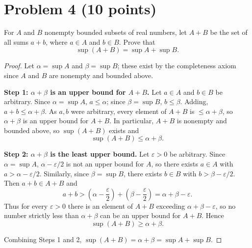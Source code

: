 \documentclass[11pt]{article}
\begin{document}
\section*{Problem 4 (10 points)}
For $A$ and $B$ nonempty bounded subsets of real numbers, let $A+B$ be
the set of all sums $a+b$, where $a\in A$ and $b\in B$. Prove that
\[
  \sup(A+B) = \sup A + \sup B.
\]

\begin{proof}
Let $\alpha = \sup A$ and $\beta = \sup B$; these exist by the completeness axiom since $A$ and $B$ are nonempty and bounded above.

\textbf{Step 1: $\alpha+\beta$ is an upper bound for $A+B$.} Let $a\in A$ and $b\in B$ be arbitrary. Since $\alpha=\sup A$, $a\le\alpha$; since $\beta=\sup B$, $b\le\beta$. Adding, $a+b \le \alpha+\beta$. As $a,b$ were arbitrary, every element of $A+B$ is $\le \alpha+\beta$, so $\alpha+\beta$ is an upper bound for $A+B$. In particular, $A+B$ is nonempty and bounded above, so $\sup(A+B)$ exists and
\[
\sup(A+B) \le \alpha+\beta.
\]

\textbf{Step 2: $\alpha+\beta$ is the least upper bound.} Let $\varepsilon>0$ be arbitrary. Since $\alpha=\sup A$, $\alpha-\varepsilon/2$ is not an upper bound for $A$, so there exists $a\in A$ with $a > \alpha-\varepsilon/2$. Similarly, since $\beta=\sup B$, there exists $b\in B$ with $b>\beta-\varepsilon/2$. Then $a+b\in A+B$ and
\[
a+b > \left(\alpha-\frac{\varepsilon}{2}\right)+\left(\beta-\frac{\varepsilon}{2}\right) = \alpha+\beta-\varepsilon.
\]
Thus for every $\varepsilon>0$ there is an element of $A+B$ exceeding $\alpha+\beta-\varepsilon$, so no number strictly less than $\alpha+\beta$ can be an upper bound for $A+B$. Hence
\[
\sup(A+B) \ge \alpha+\beta.
\]

Combining Steps 1 and 2, $\sup(A+B) = \alpha+\beta = \sup A + \sup B$.

\end{proof}
\end{document}
